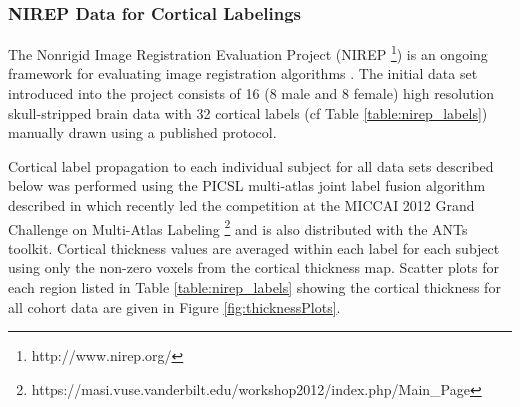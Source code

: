 %
%

\subsubsection{NIREP Data for Cortical Labelings}

The Nonrigid Image Registration Evaluation Project (NIREP%
\footnote{
http://www.nirep.org/
}) 
is an ongoing framework for evaluating image registration algorithms \citep{christensen2006}.
The initial data set introduced into the project consists of 
16 (8 male and 8 female) high resolution skull-stripped brain 
data with 32 cortical labels (cf Table \ref{table:nirep_labels}) manually drawn using a 
published protocol.

Cortical label propagation to each individual subject for all data sets
described below was performed using the PICSL multi-atlas joint label fusion
algorithm described in \cite{wang2013} which recently led the competition
at the MICCAI 2012 Grand Challenge on Multi-Atlas Labeling%
\footnote{
https://masi.vuse.vanderbilt.edu/workshop2012/index.php/Main\_Page
}
and is also 
distributed with the ANTs toolkit.  Cortical thickness values are averaged
within each label for each subject using only the non-zero voxels from the cortical thickness map.  Scatter plots for each region listed in Table \ref{table:nirep_labels}
showing the cortical thickness for all cohort data are given in Figure \ref{fig:thicknessPlots}.


